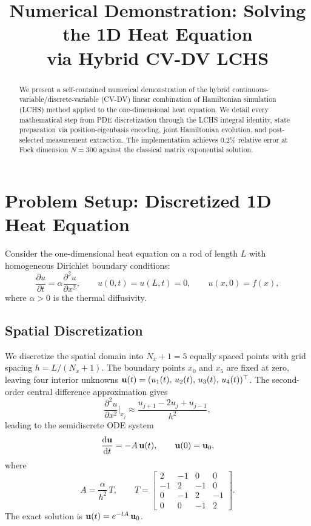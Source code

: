 \documentclass[11pt]{article}
\title{Numerical Demonstration: Solving the 1D Heat Equation\\
via Hybrid CV-DV LCHS}
\author{}
\date{}
\begin{document}
\maketitle

\begin{abstract}
We present a self-contained numerical demonstration of the hybrid
continuous-variable/discrete-variable (CV-DV) linear combination of Hamiltonian
simulation (LCHS) method applied to the one-dimensional heat equation.
We detail every mathematical step from PDE discretization through the LCHS
integral identity, state preparation via position-eigenbasis encoding, joint
Hamiltonian evolution, and post-selected measurement extraction.
The implementation achieves $0.2\%$ relative error at Fock dimension $N=300$
against the classical matrix exponential solution.
\end{abstract}

\section{Problem Setup: Discretized 1D Heat Equation}

Consider the one-dimensional heat equation on a rod of length $L$ with
homogeneous Dirichlet boundary conditions:
\begin{equation}\label{eq:heat-pde}
  \frac{\partial u}{\partial t} = \alpha \frac{\partial^2 u}{\partial x^2},
  \qquad u(0,t)=u(L,t)=0, \qquad u(x,0)=f(x),
\end{equation}
where $\alpha > 0$ is the thermal diffusivity.

\subsection{Spatial Discretization}

We discretize the spatial domain into $N_x + 1 = 5$ equally spaced points
with grid spacing $h = L/(N_x+1)$.  The boundary points $x_0$ and $x_5$ are
fixed at zero, leaving four interior unknowns
$\vb{u}(t) = (u_1(t),\,u_2(t),\,u_3(t),\,u_4(t))^\top$.
The second-order central difference approximation gives
\begin{equation}
  \frac{\partial^2 u}{\partial x^2}\bigg|_{x_j}
  \approx \frac{u_{j+1} - 2u_j + u_{j-1}}{h^2},
\end{equation}
leading to the semidiscrete ODE system
\begin{equation}\label{eq:ode}
  \dv{\vb{u}}{t} = -A\,\vb{u}(t), \qquad \vb{u}(0) = \vb{u}_0,
\end{equation}
where
\begin{equation}\label{eq:A-matrix}
  A = \frac{\alpha}{h^2}\,T, \qquad
  T = \begin{bmatrix}
    2 & -1 & 0 & 0 \\
    -1 & 2 & -1 & 0 \\
    0 & -1 & 2 & -1 \\
    0 & 0 & -1 & 2
  \end{bmatrix}.
\end{equation}
The exact solution is $\vb{u}(t) = e^{-tA}\,\vb{u}_0$.
\end{document}
